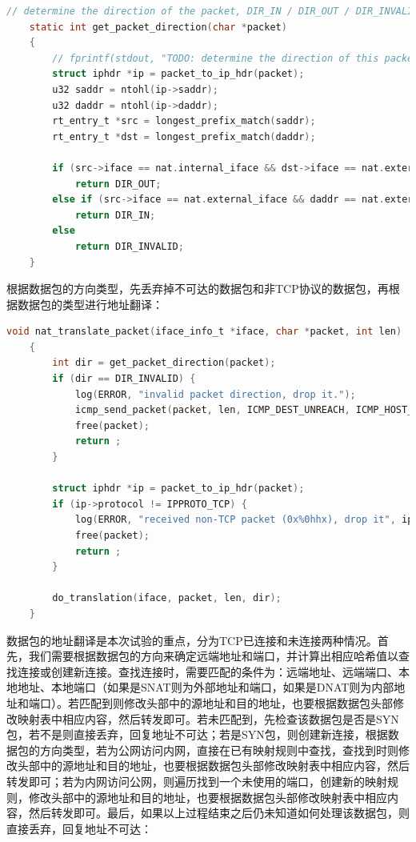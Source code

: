 \documentclass[UTF8]{report}
\begin{document}
\begin{lstlisting}[language=C]
    // determine the direction of the packet, DIR_IN / DIR_OUT / DIR_INVALID
    static int get_packet_direction(char *packet)
    {
        // fprintf(stdout, "TODO: determine the direction of this packet.\n");
        struct iphdr *ip = packet_to_ip_hdr(packet);
        u32 saddr = ntohl(ip->saddr);
        u32 daddr = ntohl(ip->daddr);
        rt_entry_t *src = longest_prefix_match(saddr);
        rt_entry_t *dst = longest_prefix_match(daddr);
    
        if (src->iface == nat.internal_iface && dst->iface == nat.external_iface)
            return DIR_OUT;
        else if (src->iface == nat.external_iface && daddr == nat.external_iface->ip)
            return DIR_IN;
        else
            return DIR_INVALID;
    }
\end{lstlisting}

根据数据包的方向类型，先丢弃掉不可达的数据包和非TCP协议的数据包，再根据数据包的类型进行地址翻译：

\begin{lstlisting}[language=C]
    void nat_translate_packet(iface_info_t *iface, char *packet, int len)
    {
        int dir = get_packet_direction(packet);
        if (dir == DIR_INVALID) {
            log(ERROR, "invalid packet direction, drop it.");
            icmp_send_packet(packet, len, ICMP_DEST_UNREACH, ICMP_HOST_UNREACH);
            free(packet);
            return ;
        }
    
        struct iphdr *ip = packet_to_ip_hdr(packet);
        if (ip->protocol != IPPROTO_TCP) {
            log(ERROR, "received non-TCP packet (0x%0hhx), drop it", ip->protocol);
            free(packet);
            return ;
        }
    
        do_translation(iface, packet, len, dir);
    }    
\end{lstlisting}

数据包的地址翻译是本次试验的重点，分为TCP已连接和未连接两种情况。首先，我们需要根据数据包的方向来确定远端地址和端口，并计算出相应哈希值以查找连接或创建新连接。查找连接时，需要匹配的条件为：远端地址、远端端口、本地地址、本地端口（如果是SNAT则为外部地址和端口，如果是DNAT则为内部地址和端口）。若匹配到则修改头部中的源地址和目的地址，也要根据数据包头部修改映射表中相应内容，然后转发即可。若未匹配到，先检查该数据包是否是SYN包，若不是则直接丢弃，回复地址不可达；若是SYN包，则创建新连接，根据数据包的方向类型，若为公网访问内网，直接在已有映射规则中查找，查找到时则修改头部中的源地址和目的地址，也要根据数据包头部修改映射表中相应内容，然后转发即可；若为内网访问公网，则遍历找到一个未使用的端口，创建新的映射规则，修改头部中的源地址和目的地址，也要根据数据包头部修改映射表中相应内容，然后转发即可。最后，如果以上过程结束之后仍未知道如何处理该数据包，则直接丢弃，回复地址不可达：
\end{document}

